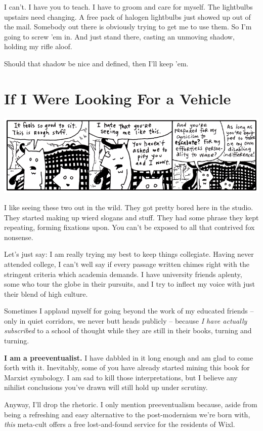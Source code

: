 \documentclass[10pt,twoside]{report}
\begin{document}
I can't.  I have you to teach.  I have to groom and care for myself.
The lightbulbs upstairs need changing.  A free pack of halogen
lightbulbs just showed up out of the mail.  Somebody out there is
obviously trying to get me to use them.  So I'm going to screw 'em in.
And just stand there, casting an unmoving shadow, holding my rifle
aloof.

Should that shadow be nice and defined, then I'll keep 'em.


\section{If I Were Looking For a Vehicle}


	\includegraphics[width=1.0\textwidth]{cache/57.png}

I like seeing these two out in the wild.  They got pretty bored here
in the studio.  They started making up wierd slogans and stuff.  They
had some phrase they kept repeating, forming fixations upon. You can't
be exposed to all that contrived fox nonsense.

Let's just say: I am really trying my best to keep things collegiate.
Having never attended college, I can't well say if every passage
written chimes right with the stringent criteria which academia
demands. I have university friends aplenty, some who tour the globe in
their pursuits, and I try to inflect my voice with just their blend of
high culture.

Sometimes I applaud myself for going beyond the work of my educated
friends -- only in quiet corridors, we never butt heads publicly --
because {\em I have actually subscribed} to a school of thought while
they are still in their books, turning and turning.

{\bf I am a preeventualist.}  I have dabbled in it long enough and am
glad to come forth with it. Inevitably, some of you have already
started mining this book for Marxist symbology.  I am sad to kill
those interpretations, but I believe any nihilist conclusions you've
drawn will still hold up under scrutiny.

Anyway, I'll drop the rhetoric.  I only mention preeventualism
because, aside from being a refreshing and easy alternative to the
post-modernism we're born with, {\em this} meta-cult offers a free
lost-and-found service for the residents of Wixl.
\end{document}

